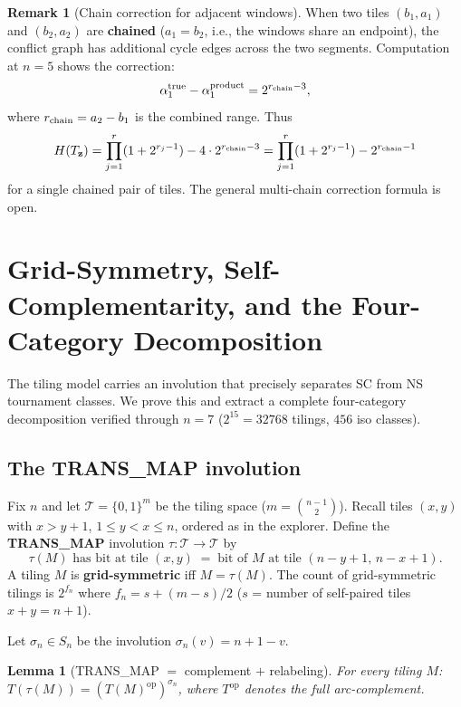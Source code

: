 \documentclass[12pt,reqno]{amsart}
\newtheorem{lemma}[theorem]{Lemma}
\theoremstyle{definition}
\newtheorem{remark}[theorem]{Remark}
\theoremstyle{plain}
\begin{document}
\begin{remark}[Chain correction for adjacent windows]
\label{rem:chain}
When two tiles $(b_1,a_1)$ and $(b_2,a_2)$ are \textbf{chained}
($a_1=b_2$, i.e., the windows share an endpoint), the conflict graph
has additional cycle edges across the two segments.  Computation at $n=5$
shows the correction:
\[
  \alpha_1^{\rm true} - \alpha_1^{\rm product} = 2^{r_{\rm chain}-3},
\]
where $r_{\rm chain}=a_2-b_1$ is the combined range.  Thus
\[
  H(T_\mathbf{z}) = \prod_{j=1}^r (1+2^{r_j-1})
  - 4\cdot 2^{r_{\rm chain}-3}
  = \prod_{j=1}^r (1+2^{r_j-1})
  - 2^{r_{\rm chain}-1}
\]
for a single chained pair of tiles.  The general multi-chain correction
formula is open.
\end{remark}

\section{Grid-Symmetry, Self-Complementarity, and the Four-Category Decomposition}
\label{sec:grid-sym-sc}

The tiling model carries an involution that precisely separates SC from NS tournament
classes.  We prove this and extract a complete four-category decomposition verified
through $n=7$ ($2^{15}=32768$ tilings, $456$ iso classes).

\subsection{The TRANS\_MAP involution}

Fix $n$ and let $\mathcal{T}=\{0,1\}^m$ be the tiling space ($m=\binom{n-1}{2}$).
Recall tiles $(x,y)$ with $x>y+1$, $1\le y<x\le n$, ordered as in the explorer.
Define the \textbf{TRANS\_MAP} involution $\tau:\mathcal{T}\to\mathcal{T}$ by
\[
  \tau(M)\text{ has bit at tile }(x,y)
  \;=\;
  \text{bit of }M\text{ at tile }(n-y+1,\,n-x+1).
\]
A tiling $M$ is \textbf{grid-symmetric} iff $M=\tau(M)$.
The count of grid-symmetric tilings is $2^{f_n}$ where
$f_n=s+(m-s)/2$ ($s$ = number of self-paired tiles $x+y=n+1$).

Let $\sigma_n\in S_n$ be the involution $\sigma_n(v)=n+1-v$.

\begin{lemma}[TRANS\_MAP $=$ complement $+$ relabeling]\label{lem:transmap}
For every tiling $M$:
$T(\tau(M)) = (T(M)^{\mathrm{op}})^{\sigma_n}$,
where $T^{\mathrm{op}}$ denotes the full arc-complement.
\end{lemma}
\end{document}
